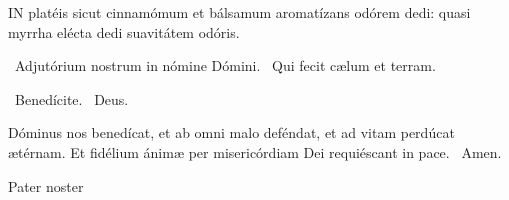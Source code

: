 
\lettrine[lines=2]{I}{N} platéis sicut cinnamómum et bálsamum aromatízans odórem dedi: quasi myrrha elécta dedi suavitátem odóris.

\V\ Adjutórium nostrum in nómine Dómini. \R\ Qui fecit cælum et terram.

\V\ Benedícite. \R\ Deus.

 Dóminus nos benedícat, et ab omni malo deféndat, et ad vitam perdúcat ætérnam. Et fidélium ánimæ per misericórdiam Dei requiéscant in pace. \R\ Amen.

 Pater noster 


